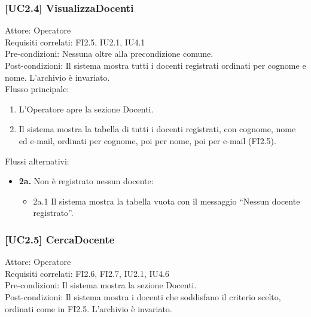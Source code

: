 \subsubsection{[UC2.4] VisualizzaDocenti}
\noindent Attore: Operatore\\
Requisiti correlati: FI2.5, IU2.1, IU4.1\\
Pre-condizioni: Nessuna oltre alla precondizione comune.\\
Post-condizioni: Il sistema mostra tutti i docenti registrati ordinati per cognome e nome. L'archivio è invariato.\\

\noindent Flusso principale:
\begin{enumerate}
\item L'Operatore apre la sezione Docenti.
\item Il sistema mostra la tabella di tutti i docenti registrati, con cognome, nome ed e-mail, ordinati per cognome, poi per nome, poi per e-mail (FI2.5).
\end{enumerate}
\noindent Flussi alternativi:
\begin{itemize}
\item \textbf{2a.} Non è registrato nessun docente:
\begin{itemize}
\item 2a.1 Il sistema mostra la tabella vuota con il messaggio ``Nessun docente registrato''.
\end{itemize}
\end{itemize}

\subsubsection{[UC2.5] CercaDocente}
\noindent Attore: Operatore\\
Requisiti correlati: FI2.6, FI2.7, IU2.1, IU4.6\\
Pre-condizioni: Il sistema mostra la sezione Docenti.\\
Post-condizioni: Il sistema mostra i docenti che soddisfano il criterio scelto, ordinati come in FI2.5. L'archivio è invariato.\\

